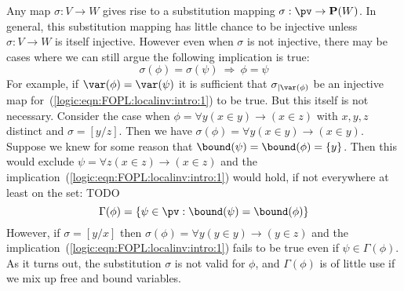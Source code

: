 Any map $\sigma:V\to W$ gives rise to a substitution mapping
$\sigma:\pv\to{\bf P}(W)$. In general, this substitution mapping has
little chance to be injective unless $\sigma:V\to W$ is itself
injective. However even when $\sigma$ is not injective, there may be
cases where we can still argue the following implication is true:
    \begin{equation}\label{logic:eqn:FOPL:localinv:intro:1}
    \sigma(\phi)=\sigma(\psi)\ \Rightarrow\ \phi=\psi
    \end{equation}
For example, if $\var(\phi)=\var(\psi)$ it is sufficient that
$\sigma_{|\var(\phi)}$ be an injective map
for~(\ref{logic:eqn:FOPL:localinv:intro:1}) to be true. But this
itself is not necessary. Consider the case when $\phi=\forall y(x\in
y)\to(x\in z)$ with $x,y,z$ distinct and $\sigma=[y/z]$. Then we
have $\sigma(\phi)=\forall y(x\in y)\to(x\in y)$. Suppose we knew
for some reason that $\bound(\psi)=\bound(\phi)=\{y\}$. Then this
would exclude $\psi=\forall z(x\in z)\to(x\in z)$ and the
implication~(\ref{logic:eqn:FOPL:localinv:intro:1}) would hold, if
not everywhere at least on the set: TODO
    \[
    \Gamma(\phi)=\{\psi\in\pv:\bound(\psi)=\bound(\phi)\}
    \]
However, if $\sigma=[y/x]$ then $\sigma(\phi)=\forall y(y\in
y)\to(y\in z)$ and the
implication~(\ref{logic:eqn:FOPL:localinv:intro:1}) fails to be true
even if $\psi\in\Gamma(\phi)$. As it turns out, the substitution
$\sigma$ is not valid for $\phi$, and $\Gamma(\phi)$ is of little
use if we mix up free and bound variables.

